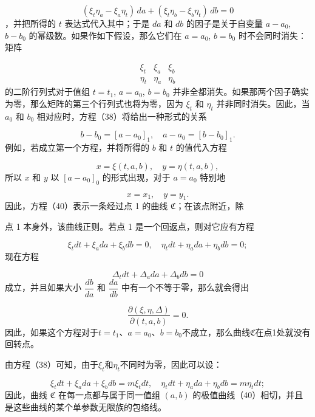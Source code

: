 \documentclass[11pt,a4paper,leqno]{article}
\begin{document}
\begin{equation}\tag{38}
(\xi_t\eta_a-\xi_a\eta_t)\,da+(\xi_t\eta_b-\xi_b\eta_t)\,db=0
\end{equation}
，并把所得的 $t$ 表达式代入其中；于是 $da$ 和 $db$ 的因子是关于自变量 $a-a_0$, $b-b_0$ 的幂级数。如果作如下假设，那么它们在 $a=a_0$, $b=b_0$ 时不会同时消失：矩阵

\begin{equation}\tag{39}
\begin{array}{ccc}
\xi_t&\xi_a&\xi_b\\
\eta_t&\eta_a&\eta_b
\end{array}
\end{equation}
的二阶行列式对于值组 $t=t_1$, $a=a_0$, $b=b_0$ 并非全都消失。如果那两个因子确实为零，那么矩阵的第三个行列式也将为零，因为 $\xi_t$ 和 $\eta_t$ 并非同时消失。因此，当 $a_0$ 和 $b_0$ 相对应时，方程（38）将给出一种形式的关系

\[
b-b_0=[a-a_0]_1,\quad a-a_0=[b-b_0]_1.
\]
例如，若成立第一个方程，并将所得的 $b$ 和 $t$ 的值代入方程

\begin{equation}\tag{40}
x=\xi(t,a,b),\quad y=\eta(t,a,b),
\end{equation}
所以 $x$ 和 $y$ 以 $[a-a_0]_0$ 的形式出现，对于 $a=a_0$ 特别地

\[
x=x_1,\quad y=y_1.
\]
因此，方程（40）表示一条经过点 1 的曲线 $\mathfrak{C}$；在该点附近，除

点 1 本身外，该曲线正则。若点 1 是一个回返点，则对它应有方程

\[
\xi_tdt+\xi_a da+\xi_b db=0,\quad \eta_tdt+\eta_a da+\eta_b db=0;
\]
现在方程

\[
\Delta_tdt+\Delta_a da+\Delta_b db=0
\]
成立，并且如果大小 $\dfrac{db}{da}$ 和 $\dfrac{da}{db}$ 中有一个不等于零，那么就会得出

\begin{equation}\tag{41}
\frac{\partial(\xi,\eta,\Delta)}{\partial(t,a,b)}=0.
\end{equation}
因此，如果这个方程对于$t=t_1$、$a=a_0$、$b=b_0$不成立，那么曲线$\mathfrak{C}$在点1处就没有回转点。

由方程（38）可知，由于$\xi_t$和$\eta_t$不同时为零，因此可以设：

\begin{equation}\tag{42}
\xi_tdt+\xi_a da+\xi_b db=m\xi_tdt,\quad
\eta_tdt+\eta_a da+\eta_b db=m\eta_tdt;
\end{equation}
因此，曲线 $\mathfrak{C}$ 在每一点都与属于同一值组 $(a,b)$ 的极值曲线（40）相切，并且是这些曲线的某个单参数无限族的包络线。
\end{document}
